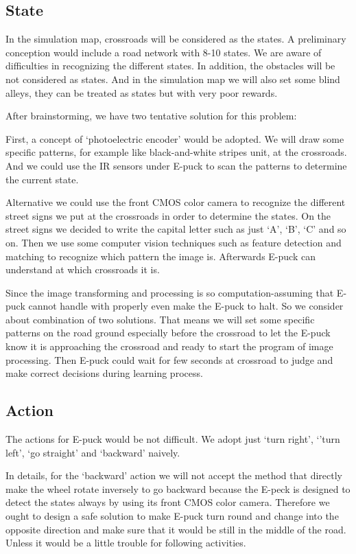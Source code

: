 \documentclass[
11pt, %
a4paper, %
oneside, %
headinclude%
BCOR3mm, %
]{scrartcl}
\begin{document}
\subsection{State}
\quad
In the simulation map, crossroads will be considered as the states. 
A preliminary conception would include a road network with 8-10 states. 
We are aware of difficulties in recognizing the different states.
In addition, the obstacles will be not considered as states. 
And in the simulation map we will also set some blind alleys, they can be treated as states but with very poor rewards.

After brainstorming, we have two tentative solution for this problem:


First, a concept of ‘photoelectric encoder’ would be adopted. 
We will draw some specific patterns, for example like black-and-white stripes unit, at the crossroads. And we could use the IR sensors under E-puck to scan the patterns to determine the current state. 


Alternative we could use the front CMOS color camera to recognize the different street signs we put at the crossroads in order to determine the states. 
On the street signs we decided to write the capital letter such as just ‘A’, ‘B’, ‘C’ and so on. 
Then we use some computer vision techniques such as feature detection and matching to recognize which pattern the image is. 
Afterwards E-puck can understand at which crossroads it is.


Since the image transforming and processing is so computation-assuming that E-puck cannot handle with properly even make the E-puck to halt. 
So we consider about combination of two solutions. 
That means we will set some specific patterns on the road ground especially before the crossroad to let the E-puck know it is approaching the crossroad and ready to start the program of image processing. 
Then E-puck could wait for few seconds at crossroad to judge and make correct decisions during learning process.

\subsection{Action}
The actions for E-puck would be not difficult. We adopt just ‘turn right’, ‘’turn left’, ‘go straight’ and ‘backward’ naively. 


In details, for the ‘backward’ action we will not accept the method that directly make the wheel rotate inversely to go backward because the E-peck is designed to detect the states always by using its front CMOS color camera. 
Therefore we ought to design a safe solution to make E-puck turn round and change into the opposite direction and make sure that it would be still in the middle of the road. Unless it would be a little trouble for following activities.
\end{document}
